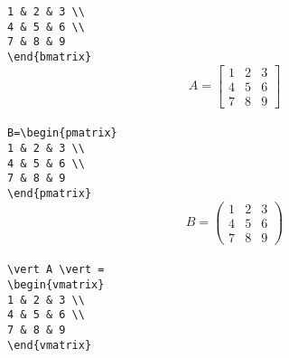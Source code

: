 \documentclass[12pt]{article}
\theoremstyle{definition}
\begin{document}
\verb!1 & 2 & 3 \\!\\
\verb!4 & 5 & 6 \\!\\
\verb!7 & 8 & 9!\\
\verb!\end{bmatrix}!\\
\[
A=\begin{bmatrix}
1 & 2 & 3 \\
4 & 5 & 6 \\
7 & 8 & 9
\end{bmatrix}
\]
\\
\verb!B=\begin{pmatrix}!\\
\verb!1 & 2 & 3 \\!\\
\verb!4 & 5 & 6 \\!\\
\verb!7 & 8 & 9!\\
\verb!\end{pmatrix}!\\
\[
B=\begin{pmatrix}
1 & 2 & 3 \\
4 & 5 & 6 \\
7 & 8 & 9
\end{pmatrix}
\]
\\
\verb!\vert A \vert =!\\
\verb!\begin{vmatrix}!\\
\verb!1 & 2 & 3 \\!\\
\verb!4 & 5 & 6 \\!\\
\verb!7 & 8 & 9!\\
\verb!\end{vmatrix}!\\
\end{document}
